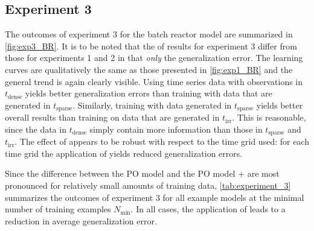 \subsection{Experiment 3}
The outcomes of experiment 3 for the batch reactor model are summarized in \autoref{fig:exp3_BR}. 
It is to be noted that the  of  results for experiment 3 differ from those for experiments 1 and 2 in that 
 \emph{only} the generalization error.
The learning curves are qualitatively the same as those presented in \autoref{fig:exp1_BR} and the general trend is again clearly visible. 
Using time series data with observations in $t_{\text{dense}}$ yields better generalization errors than training with data that are generated in $t_{\text{sparse}}$.
Similarly, training with data generated in $t_{\text{sparse}}$ yields better overall results than training on data that are generated in $t_{\text{irr}}$.
This is reasonable, since the data in $t_{\text{dense}}$ simply contain more information than those in $t_{\text{sparse}}$ and $t_{\text{irr}}$.
The effect of \myMethod{} appears to be robust with respect to the time grid used:
for each time grid the application of \myMethod{} yields reduced generalization errors.

Since the difference between the PO model and the PO model + \myMethod{} are most pronounced for relatively small amounts of training data, \autoref{tab:experiment_3} summarizes the outcomes of experiment 3 for all example models at the minimal number of training examples $N_{\min}$.
In all cases, the application of \myMethod{} leads to a reduction in average generalization error.